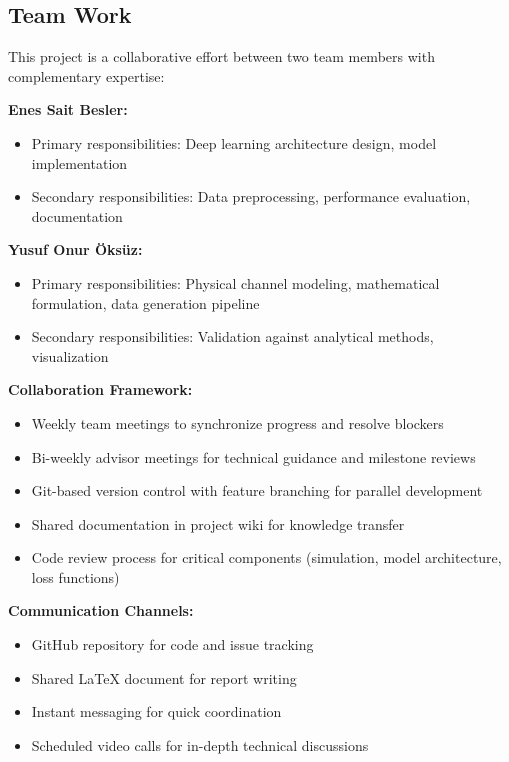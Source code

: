 \documentclass[a4paper,12pt]{report}
\begin{document}
\subsection{Team Work}

This project is a collaborative effort between two team members with complementary expertise:

\textbf{Enes Sait Besler:}
\begin{itemize}
    \item Primary responsibilities: Deep learning architecture design, model implementation
    \item Secondary responsibilities: Data preprocessing, performance evaluation, documentation
\end{itemize}

\textbf{Yusuf Onur Öksüz:}
\begin{itemize}
    \item Primary responsibilities: Physical channel modeling, mathematical formulation, data generation pipeline
    \item Secondary responsibilities: Validation against analytical methods,  visualization
\end{itemize}

\textbf{Collaboration Framework:}
\begin{itemize}
    \item Weekly team meetings to synchronize progress and resolve blockers
    \item Bi-weekly advisor meetings for technical guidance and milestone reviews
    \item Git-based version control with feature branching for parallel development
    \item Shared documentation in project wiki for knowledge transfer
    \item Code review process for critical components (simulation, model architecture, loss functions)
\end{itemize}

\textbf{Communication Channels:}
\begin{itemize}
    \item GitHub repository for code and issue tracking
    \item Shared LaTeX document for report writing
    \item Instant messaging for quick coordination
    \item Scheduled video calls for in-depth technical discussions
\end{itemize}
\end{document}
